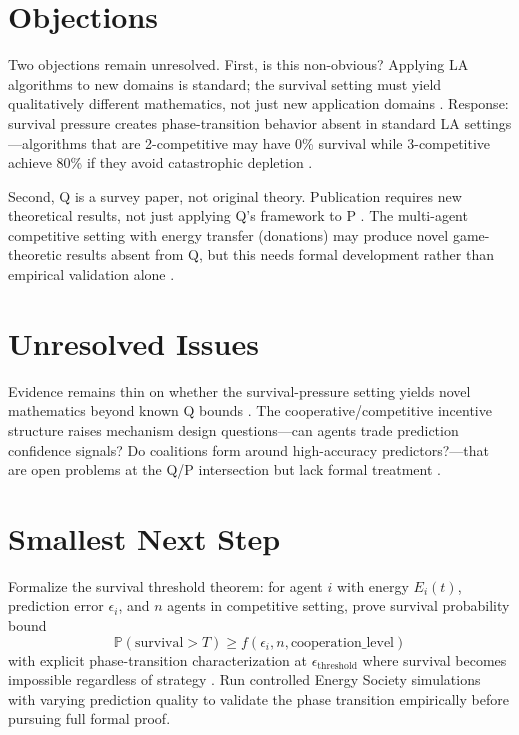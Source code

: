 \documentclass{article}
\begin{document}
\section*{Objections}

Two objections remain unresolved. First, is this non-obvious? Applying LA algorithms to new domains is standard; the survival setting must yield qualitatively different mathematics, not just new application domains . Response: survival pressure creates phase-transition behavior absent in standard LA settings---algorithms that are 2-competitive may have 0\% survival while 3-competitive achieve 80\% if they avoid catastrophic depletion .

Second, Q is a survey paper, not original theory. Publication requires new theoretical results, not just applying Q's framework to P . The multi-agent competitive setting with energy transfer (donations) may produce novel game-theoretic results absent from Q, but this needs formal development rather than empirical validation alone .

\section*{Unresolved Issues}

Evidence remains thin on whether the survival-pressure setting yields novel mathematics beyond known Q bounds . The cooperative/competitive incentive structure raises mechanism design questions---can agents trade prediction confidence signals? Do coalitions form around high-accuracy predictors?---that are open problems at the Q/P intersection but lack formal treatment .

\section*{Smallest Next Step}

Formalize the survival threshold theorem: for agent \(i\) with energy \(E_i(t)\), prediction error \(\epsilon_i\), and \(n\) agents in competitive setting, prove survival probability bound
\[
\mathbb{P}(\text{survival} > T) \geq f(\epsilon_i, n, \text{cooperation\_level})
\]
with explicit phase-transition characterization at \(\epsilon_{\text{threshold}}\) where survival becomes impossible regardless of strategy . Run controlled Energy Society simulations with varying prediction quality to validate the phase transition empirically before pursuing full formal proof.
\end{document}
